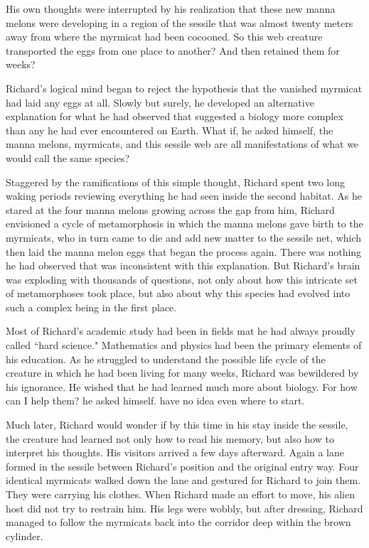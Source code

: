\documentclass[]{article}
\begin{document}
{{His own thoughts were interrupted by his realization that these new manna melons were developing in a region of the sessile that was almost twenty meters away from where the myrmicat had been cocooned.  So this web creature transported the eggs from one place to another? And then retained them for weeks?

Richard’s logical mind began to reject the hypothesis that the vanished myrmicat had laid any eggs at all.  Slowly but surely, he developed an alternative explanation for what he had observed that suggested a biology more complex than any he had ever encountered on Earth.  What if, he asked himself, the manna melons, myrmicats, and this sessile web are all manifestations of what we would call the same species?

Staggered by the ramifications of this simple thought, Richard spent two long waking periods reviewing everything he had seen inside the second habitat.  As he stared at the four manna melons growing across the gap from him, Richard envisioned a cycle of metamorphosis in which the manna melons gave birth to the myrmicats, who in turn came to die and add new matter to the sessile net, which then laid the manna melon eggs that began the process again.  There was nothing he had observed that was inconsistent with this explanation.  But Richard’s brain was exploding with thousands of questions, not only about how this intricate set of metamorphoses took place, but also about why this species had evolved into such a complex being in the first place.

Most of Richard’s academic study had been in fields mat he had always proudly called “hard science."  Mathematics and physics had been the primary elements of his education.  As he struggled to understand the possible life cycle of the creature in which he had been living for many weeks, Richard was bewildered by his ignorance.  He wished that he had learned much more about biology.  For how can I help them? he asked himself.  have no idea even where to start.

Much later, Richard would wonder if by this time in his stay inside the sessile, the creature had learned not only how to read his memory, but also how to interpret his thoughts.  His visitors arrived a few days afterward.  Again a lane formed in the sessile between Richard’s position and the original entry way.  Four identical myrmicats walked down the lane and gestured for Richard to join them.  They were carrying his clothes.  When Richard made an effort to move, his alien host did not try to restrain him.  His legs were wobbly, but after dressing, Richard managed to follow the myrmicats back into the corridor deep within the brown cylinder.

}}
\end{document}

